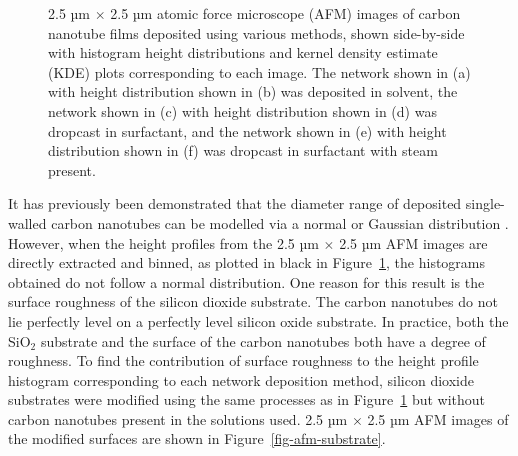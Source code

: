 \documentclass[
  a4paper,
]{scrbook}
\begin{document}
\begin{figure}
\begin{minipage}[t]{0.47\linewidth}
{{}

}

\subcaption{\label{fig-steaming-network-histogram}}
\end{minipage}%

\caption{\label{fig-afm-morphology}2.5 µm \(\times\) 2.5 µm atomic force
microscope (AFM) images of carbon nanotube films deposited using various
methods, shown side-by-side with histogram height distributions and
kernel density estimate (KDE) plots corresponding to each image. The
network shown in (a) with height distribution shown in (b) was deposited
in solvent, the network shown in (c) with height distribution shown in
(d) was dropcast in surfactant, and the network shown in (e) with height
distribution shown in (f) was dropcast in surfactant with steam
present.}

\end{figure}

It has previously been demonstrated that the diameter range of deposited
single-walled carbon nanotubes can be modelled via a normal or Gaussian
distribution \autocite{LeMieux2008,Liu2013,Vobornik2023}. However, when
the height profiles from the 2.5 µm \(\times\) 2.5 µm AFM images are
directly extracted and binned, as plotted in black in
Figure~\ref{fig-afm-morphology}, the histograms obtained do not follow a
normal distribution. One reason for this result is the surface roughness
of the silicon dioxide substrate. The carbon nanotubes do not lie
perfectly level on a perfectly level silicon oxide substrate. In
practice, both the SiO\(_2\) substrate and the surface of the carbon
nanotubes both have a degree of roughness. To find the contribution of
surface roughness to the height profile histogram corresponding to each
network deposition method, silicon dioxide substrates were modified
using the same processes as in Figure~\ref{fig-afm-morphology} but
without carbon nanotubes present in the solutions used. 2.5 µm
\(\times\) 2.5 µm AFM images of the modified surfaces are shown in
Figure~\ref{fig-afm-substrate}.
\end{document}
